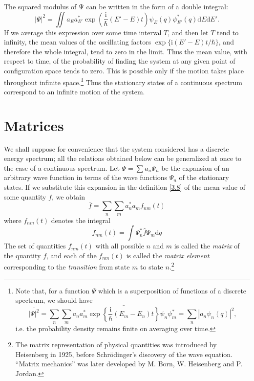 The squared modulus of Ψ can be written in the form of a double integral:
\[ |\Psi|^2=\iint a_Ea_{E'}^*\exp\left(\frac{\mathrm{i}}{\hbar}(E'-E)t \right)\psi_E(q)\psi_{E'}^*(q)\mathrm{d}E\mathrm{d}E'. \]
If we average this expression over some time interval $ T $, and then let $ T $ tend to infinity, the mean values of the oscillating factors $ \exp\{ \mathrm{i}(E'-E)t/\hbar\} $, and therefore the whole integral, tend to zero in the limit. Thus the mean value, with respect to time, of the probability of finding the system at any given point of configuration space tends to zero. This is possible only if the motion takes place throughout infinite space.\footnote{Note that, for a function $ Ψ $ which is a superposition of functions of a discrete spectrum, we should have
	\[ \bar{|\Psi|^2}=\sum_{n}\sum_{m}a_na_m^*\bar{\exp\left\{\frac{\mathrm{i}}{\hbar}(E_m-E_n)t  \right\}}\psi_n\psi_m^*=\sum_{n}|a_n\psi_n(q)|^2, \]
i.e. the probability density remains finite on averaging over time.
} Thus the stationary states of a continuous spectrum correspond to an infinite motion of the system.
\section{Matrices}\label{Matrices}
We shall suppose for convenience that the system considered has a discrete energy spectrum; all the relations obtained below can be generalized at once to the case of a continuous spectrum. Let $ \Psi=\sum a_n\Psi_n $ be the expansion of an arbitrary wave function in terms of the wave functions $ \Psi_n $ of the stationary states. If we substitute this expansion in the definition \eqref{3.8} of the mean value of some quantity $ f $, we obtain
\begin{equation}\label{11.1}
\bar{f}=\sum_{n}\sum_{m}a_n^*a_mf_{nm}(t)
\end{equation}
where $ f_{nm}(t) $ denotes the integral
\begin{equation}\label{11.2}
f_{nm}(t)=\int\Psi_n^*\hat{f}\Psi_m\mathrm{d}q
\end{equation}
The set of quantities $ f_{nm}(t) $ with all possible $ n $ and $ m $ is called the \textit{matrix} of the quantity $ f $, and each of the $ f_{nm}(t) $ is called the \textit{matrix element} corresponding to the \textit{transition} from state $ m $ to state $ n $.\footnote{The matrix representation of physical quantities was introduced by Heisenberg in 1925, before Schrödinger’s discovery of the wave equation. “Matrix mechanics” was later developed by M. Born, W. Heisenberg and P. Jordan.
}


